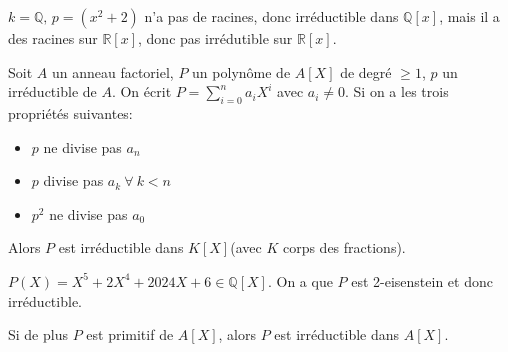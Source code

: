 \begin{exemple}
	$k = \mathbb{Q}, \,p = (x^2 + 2 )$ n'a pas de racines, donc irréductible dans $\mathbb{Q}[x]$, mais il a des racines sur $\mathbb{R}[x]$, donc pas irrédutible sur $\mathbb{R}[x]$.
\end{exemple}

\begin{theorem}
	Soit $A$ un anneau factoriel, $P$ un polynôme  de $A[X]$ de degré $\geq 1$, $p$ un irréductible de $A$.
	On écrit $P = \sum\limits_{i=0}^n a_iX^i$ avec $a_i \neq 0$. Si on a les trois propriétés suivantes:
	\begin{itemize}
		\item $p$ ne divise pas $a_n$
		\item $p$ divise pas $a_k \ \forall \ k < n$
		\item $p^2$ ne divise pas $a_0$
	\end{itemize}
	Alors $P$ est irréductible dans $K[X]$(avec $K$ corps des fractions).
\end{theorem}

\begin{exemple}
	$P(X) = X^5 + 2X^4 + 2024X + 6\in \mathbb{Q}[X]$. On a que $P$ est 2-eisenstein et donc irréductible.
\end{exemple}

\begin{coro}
	Si de plus $P$ est primitif de $A[X]$, alors $P$ est irréductible dans $A[X]$.
\end{coro}
